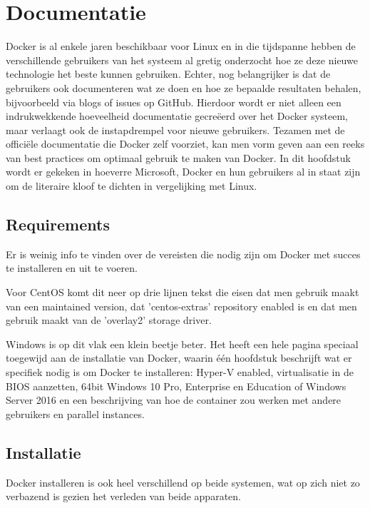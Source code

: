 
\chapter{Documentatie}
\label{ch:documentatie}

Docker is al enkele jaren beschikbaar voor Linux en in die tijdspanne hebben de verschillende gebruikers van het systeem al gretig onderzocht hoe ze deze nieuwe technologie het beste kunnen gebruiken. Echter, nog belangrijker is dat de gebruikers ook documenteren wat ze doen en hoe ze bepaalde resultaten behalen, bijvoorbeeld via blogs of issues op GitHub. Hierdoor wordt er niet alleen een indrukwekkende hoeveelheid documentatie gecreëerd over het Docker systeem, maar verlaagt ook de instapdrempel voor nieuwe gebruikers. Tezamen met de officiële documentatie die Docker zelf voorziet, kan men vorm geven aan een reeks van best practices om optimaal gebruik te maken van Docker. In dit hoofdstuk wordt er gekeken in hoeverre Microsoft, Docker en hun gebruikers al in staat zijn om de literaire kloof te dichten in vergelijking met Linux.

\section{Requirements}
Er is weinig info te vinden over de vereisten die nodig zijn om Docker met succes te installeren en uit te voeren.

Voor CentOS komt dit neer op drie lijnen tekst die eisen dat men gebruik maakt van een maintained version, dat 'centos-extras' repository enabled is en dat men gebruik maakt van de 'overlay2' storage driver. \autocite{Docker2018a}

Windows is op dit vlak een klein beetje beter. Het heeft een hele pagina speciaal toegewijd aan de installatie van Docker, waarin één hoofdstuk beschrijft wat er specifiek nodig is om Docker te installeren: Hyper-V enabled, virtualisatie in de BIOS aanzetten, 64bit Windows 10 Pro, Enterprise en Education of Windows Server 2016 en een beschrijving van hoe de container zou werken met andere gebruikers en parallel instances. \autocite{Docker2018}

\section{Installatie}
Docker installeren is ook heel verschillend op beide systemen, wat op zich niet zo verbazend is gezien het verleden van beide apparaten.

